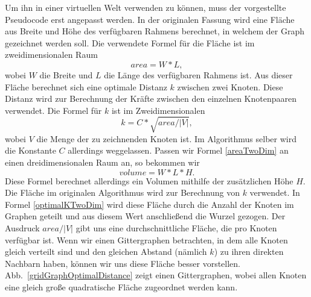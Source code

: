 \documentclass[12pt, a4paper]{article}
\begin{document}
Um ihn in einer virtuellen Welt verwenden zu können, muss der vorgestellte Pseudocode erst angepasst werden. In der originalen Fassung wird eine Fläche aus Breite und Höhe des verfügbaren Rahmens berechnet, in welchem der Graph gezeichnet werden soll. Die verwendete Formel für die Fläche ist im zweidimensionalen Raum
\begin{equation} \label{areaTwoDim}
area = W * L,
\end{equation}
wobei $W$ die Breite und $L$ die Länge des verfügbaren Rahmens ist. Aus dieser Fläche berechnet sich eine optimale Distanz $k$ zwischen zwei Knoten. Diese Distanz wird zur Berechnung der Kräfte zwischen den einzelnen Knotenpaaren verwendet. Die Formel für $k$ ist im Zweidimensionalen
\begin{equation} \label{optimalKTwoDim}
k = C * \sqrt{area / |V|},
\end{equation}
wobei $V$ die Menge der zu zeichnenden Knoten ist. Im Algorithmus selber wird die Konstante $C$ allerdings weggelassen. Passen wir Formel \eqref{areaTwoDim} an einen dreidimensionalen Raum an, so bekommen wir
\begin{equation} \label{volumeThreeDim}
volume = W * L * H.
\end{equation}
Diese Formel berechnet allerdings ein Volumen mithilfe der zusätzlichen Höhe $H$. Die Fläche im originalen Algorithmus wird zur Berechnung von $k$ verwendet. In Formel \eqref{optimalKTwoDim} wird diese Fläche durch die Anzahl der Knoten im Graphen geteilt und aus diesem Wert anschließend die Wurzel gezogen. Der Ausdruck $area/|V|$ gibt uns eine durchschnittliche Fläche, die pro Knoten verfügbar ist. Wenn wir einen Gittergraphen betrachten, in dem alle Knoten gleich verteilt sind und den gleichen Abstand (nämlich $k$) zu ihren direkten Nachbarn haben, können wir uns diese Fläche besser vorstellen. Abb.~\ref{gridGraphOptimalDistance} zeigt einen Gittergraphen, wobei allen Knoten eine gleich große quadratische Fläche zugeordnet werden kann.\\
\end{document}

